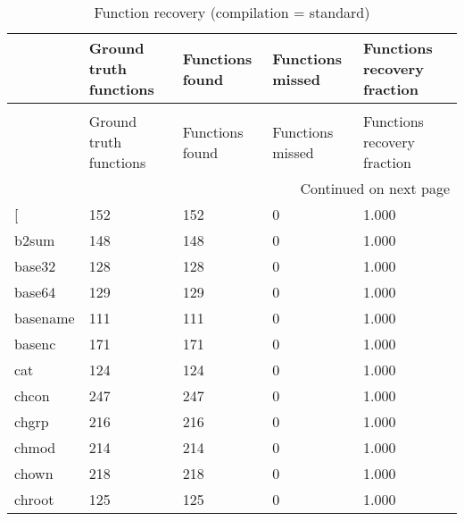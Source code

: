 \begin{longtable}{lp{4.5cm}p{4.5cm}p{4.5cm}p{4.5cm}}
\caption{Function recovery (compilation = standard)}
\label{table:functions-O0}\\
\toprule
{} &  Ground truth functions &  Functions found &  Functions missed &  Functions recovery fraction \\
\midrule
\endfirsthead
\caption[]{Function recovery (compilation = standard)} \\
\toprule
{} &  Ground truth functions &  Functions found &  Functions missed &  Functions recovery fraction \\
\midrule
\endhead
\midrule
\multicolumn{5}{r}{{Continued on next page}} \\
\midrule
\endfoot

\bottomrule
\endlastfoot
{[}         &                     152 &              152 &                 0 &                        1.000 \\
b2sum     &                     148 &              148 &                 0 &                        1.000 \\
base32    &                     128 &              128 &                 0 &                        1.000 \\
base64    &                     129 &              129 &                 0 &                        1.000 \\
basename  &                     111 &              111 &                 0 &                        1.000 \\
basenc    &                     171 &              171 &                 0 &                        1.000 \\
cat       &                     124 &              124 &                 0 &                        1.000 \\
chcon     &                     247 &              247 &                 0 &                        1.000 \\
chgrp     &                     216 &              216 &                 0 &                        1.000 \\
chmod     &                     214 &              214 &                 0 &                        1.000 \\
chown     &                     218 &              218 &                 0 &                        1.000 \\
chroot    &                     125 &              125 &                 0 &                        1.000 \\

\end{longtable}
